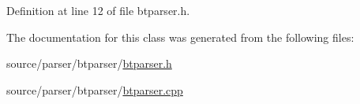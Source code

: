 Definition at line 12 of file btparser.h.



The documentation for this class was generated from the following files:\begin{DoxyCompactItemize}
\item 
source/parser/btparser/\hyperlink{btparser_8h}{btparser.h}\item 
source/parser/btparser/\hyperlink{btparser_8cpp}{btparser.cpp}\end{DoxyCompactItemize}
